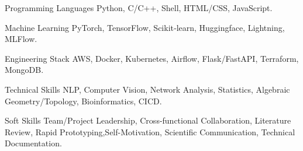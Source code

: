 

\begin{cvskills}

  \cvskill
    {Programming Languages} %
    {Python, C/C++, Shell, HTML/CSS, JavaScript.} %

  \cvskill
    {Machine Learning} %
    {PyTorch, TensorFlow, Scikit‑learn, Huggingface, Lightning, MLFlow.} %

  \cvskill
    {Engineering Stack} %
    {AWS, Docker, Kubernetes, Airflow, Flask/FastAPI, Terraform, MongoDB.} %
    
  \cvskill
    {Technical Skills} %
    {NLP, Computer Vision, Network Analysis, Statistics, Algebraic Geometry/Topology, Bioinformatics, CICD.} %

  \cvskill
    {Soft Skills} %
    {Team/Project Leadership, Cross-functional Collaboration, Literature Review, Rapid Prototyping,\newline Self-Motivation, Scientific Communication, Technical Documentation.} %

\end{cvskills}
